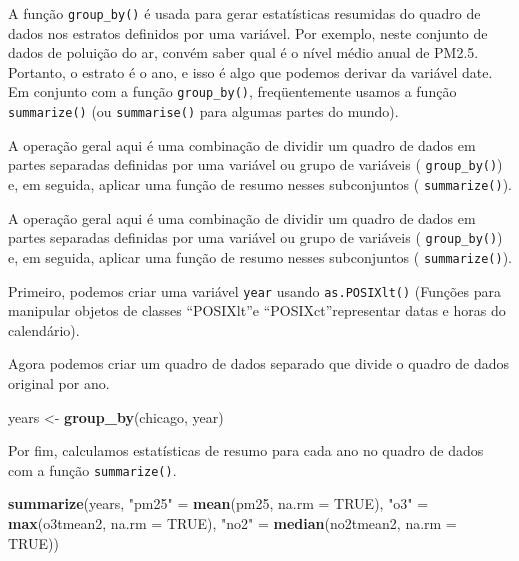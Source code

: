 \documentclass[]{book}
\newenvironment{Shaded}{\begin{snugshade}}{\end{snugshade}}
\newcommand{\DataTypeTok}[1]{\textcolor[rgb]{0.13,0.29,0.53}{#1}}
\newcommand{\DecValTok}[1]{\textcolor[rgb]{0.00,0.00,0.81}{#1}}
\newcommand{\KeywordTok}[1]{\textcolor[rgb]{0.13,0.29,0.53}{\textbf{#1}}}
\newcommand{\NormalTok}[1]{#1}
\newcommand{\OperatorTok}[1]{\textcolor[rgb]{0.81,0.36,0.00}{\textbf{#1}}}
\newcommand{\OtherTok}[1]{\textcolor[rgb]{0.56,0.35,0.01}{#1}}
\newcommand{\StringTok}[1]{\textcolor[rgb]{0.31,0.60,0.02}{#1}}
\begin{document}
A função \texttt{group\_by()} é usada para gerar estatísticas resumidas do quadro de dados nos estratos definidos por uma variável. Por exemplo, neste conjunto de dados de poluição do ar, convém saber qual é o nível médio anual de PM2.5. Portanto, o estrato é o ano, e isso é algo que podemos derivar da variável date. Em conjunto com a função \texttt{group\_by()}, freqüentemente usamos a função \texttt{summarize()} (ou \texttt{summarise()} para algumas partes do mundo).

A operação geral aqui é uma combinação de dividir um quadro de dados em partes separadas definidas por uma variável ou grupo de variáveis ( \texttt{group\_by()}) e, em seguida, aplicar uma função de resumo nesses subconjuntos ( \texttt{summarize()}).

A operação geral aqui é uma combinação de dividir um quadro de dados em partes separadas definidas por uma variável ou grupo de variáveis ( \texttt{group\_by()}) e, em seguida, aplicar uma função de resumo nesses subconjuntos ( \texttt{summarize()}).

Primeiro, podemos criar uma variável \texttt{year} usando \texttt{as.POSIXlt()} (Funções para manipular objetos de classes ``POSIXlt''e ``POSIXct''representar datas e horas do calendário).

\begin{Shaded}
\end{Shaded}

Agora podemos criar um quadro de dados separado que divide o quadro de dados original por ano.

\begin{Shaded}
\begin{Highlighting}[]
\NormalTok{years <-}\StringTok{ }\KeywordTok{group_by}\NormalTok{(chicago, year)}
\end{Highlighting}
\end{Shaded}

Por fim, calculamos estatísticas de resumo para cada ano no quadro de dados com a função \texttt{summarize()}.

\begin{Shaded}
\begin{Highlighting}[]
\KeywordTok{summarize}\NormalTok{(years, }\StringTok{"pm25"}\NormalTok{ =}\StringTok{ }\KeywordTok{mean}\NormalTok{(pm25, }\DataTypeTok{na.rm =} \OtherTok{TRUE}\NormalTok{), }
           \StringTok{"o3"}\NormalTok{ =}\StringTok{ }\KeywordTok{max}\NormalTok{(o3tmean2, }\DataTypeTok{na.rm =} \OtherTok{TRUE}\NormalTok{), }
           \StringTok{"no2"}\NormalTok{ =}\StringTok{ }\KeywordTok{median}\NormalTok{(no2tmean2, }\DataTypeTok{na.rm =} \OtherTok{TRUE}\NormalTok{))}
\end{Highlighting}
\end{Shaded}
\end{document}
